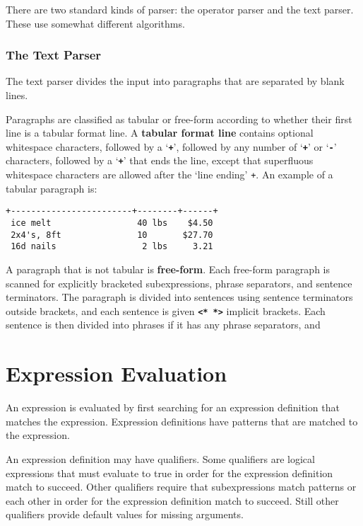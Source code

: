 \documentclass[12pt]{article}
\newcommand{\TT}[1]{{\tt \bfseries #1}}
\newcommand{\key}[1]{{\rm \bfseries #1}}
\newcommand{\ttkey}[1]{{\tt \bfseries #1}}
\newenvironment{indpar}[1][0.3in]%
	{\begin{list}{}%
		     {\setlength{\itemsep}{0in}%
		      \setlength{\topsep}{0in}%
		      \setlength{\parsep}{1ex}%
		      \setlength{\labelwidth}{#1}%
		      \setlength{\leftmargin}{#1}%
		      \addtolength{\leftmargin}{\labelsep}}%
	 \item}%
	{\end{list}}
\begin{document}
There are two standard kinds of parser: the operator parser
and the text parser.  These use somewhat different algorithms.

\subsubsection{The Text Parser}
\label{TEXT-PARSER}

The text parser divides the input into paragraphs that are separated by
blank lines.

Paragraphs are classified as tabular or free-form according
to whether their first line is a tabular format line.
A \key{tabular format line} contains optional whitespace characters,
followed by a `\ttkey{+}', followed
by any number of `\TT{+}' or
`\ttkey{-}' characters,
followed by a `\TT{+}' that ends the line, except that superfluous
whitespace characters are allowed after the `line ending' {\tt+}.
An example of a tabular paragraph is:


\begin{indpar}\begin{verbatim}
+------------------------+--------+------+
 ice melt                 40 lbs    $4.50
 2x4's, 8ft               10       $27.70
 16d nails                 2 lbs     3.21
\end{verbatim}\end{indpar}


A paragraph that is not tabular is \key{free-form}.
Each free-form paragraph is scanned for explicitly bracketed subexpressions,
phrase separators, and sentence terminators.  The paragraph is divided into
sentences using sentence terminators outside brackets, and each sentence
is given \TT{<* *>} implicit brackets.
Each sentence is then divided into
phrases if it has any phrase separators, and 



\section{Expression Evaluation}
\label{EXPRESSION-EVALUATION}

An expression is evaluated by first searching for an expression definition
that matches the expression.  Expression definitions have patterns that
are matched to the expression.

An expression definition may have
qualifiers.  Some qualifiers are logical expressions that
must evaluate to true in order for the expression definition match to succeed.
Other qualifiers require that subexpressions match patterns or each other
in order for the expression definition match to succeed.
Still other qualifiers provide default values for missing
arguments.
\end{document}
